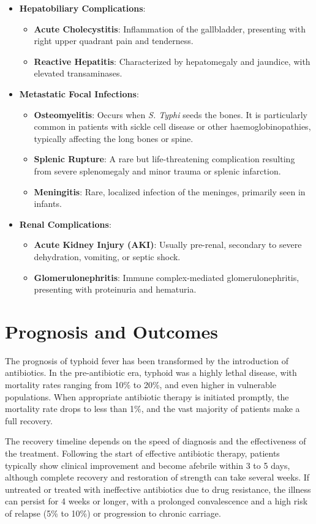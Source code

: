 \begin{itemize}
  \item \textbf{Hepatobiliary Complications}:
  \begin{itemize}
    \item \textbf{Acute Cholecystitis}: Inflammation of the gallbladder, presenting with right upper quadrant pain and tenderness.
    \item \textbf{Reactive Hepatitis}: Characterized by hepatomegaly and jaundice, with elevated transaminases.
  \end{itemize}
  \item \textbf{Metastatic Focal Infections}:
  \begin{itemize}
    \item \textbf{Osteomyelitis}: Occurs when \textit{S. Typhi} seeds the bones. It is particularly common in patients with sickle cell disease or other haemoglobinopathies, typically affecting the long bones or spine.
    \item \textbf{Splenic Rupture}: A rare but life-threatening complication resulting from severe splenomegaly and minor trauma or splenic infarction.
    \item \textbf{Meningitis}: Rare, localized infection of the meninges, primarily seen in infants.
  \end{itemize}
  \item \textbf{Renal Complications}:
  \begin{itemize}
    \item \textbf{Acute Kidney Injury (AKI)}: Usually pre-renal, secondary to severe dehydration, vomiting, or septic shock.
    \item \textbf{Glomerulonephritis}: Immune complex-mediated glomerulonephritis, presenting with proteinuria and hematuria.
  \end{itemize}
\end{itemize}

\section*{Prognosis and Outcomes}
The prognosis of typhoid fever has been transformed by the introduction of antibiotics. In the pre-antibiotic era, typhoid was a highly lethal disease, with mortality rates ranging from 10\% to 20\%, and even higher in vulnerable populations. When appropriate antibiotic therapy is initiated promptly, the mortality rate drops to less than 1\%, and the vast majority of patients make a full recovery.

The recovery timeline depends on the speed of diagnosis and the effectiveness of the treatment. Following the start of effective antibiotic therapy, patients typically show clinical improvement and become afebrile within 3 to 5 days, although complete recovery and restoration of strength can take several weeks. If untreated or treated with ineffective antibiotics due to drug resistance, the illness can persist for 4 weeks or longer, with a prolonged convalescence and a high risk of relapse (5\% to 10\%) or progression to chronic carriage.

